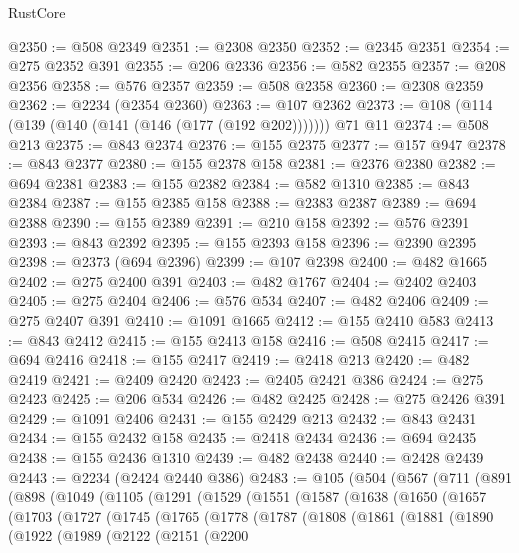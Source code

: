 \begin{lexlean}{RustCore}
\begin{coremodule}
@2350 := @508 @2349
@2351 := @2308 @2350
@2352 := @2345 @2351
@2354 := @275 @2352 @391
@2355 := @206 @2336
@2356 := @582 @2355
@2357 := @208 @2356
@2358 := @576 @2357
@2359 := @508 @2358
@2360 := @2308 @2359
@2362 := @2234 (@2354 @2360)
@2363 := @107 @2362
@2373 := @108 (@114 (@139 (@140 (@141 (@146 (@177 (@192 @202))))))) @71 @11
@2374 := @508 @213
@2375 := @843 @2374
@2376 := @155 @2375
@2377 := @157 @947
@2378 := @843 @2377
@2380 := @155 @2378 @158
@2381 := @2376 @2380
@2382 := @694 @2381
@2383 := @155 @2382
@2384 := @582 @1310
@2385 := @843 @2384
@2387 := @155 @2385 @158
@2388 := @2383 @2387
@2389 := @694 @2388
@2390 := @155 @2389
@2391 := @210 @158
@2392 := @576 @2391
@2393 := @843 @2392
@2395 := @155 @2393 @158
@2396 := @2390 @2395
@2398 := @2373 (@694 @2396)
@2399 := @107 @2398
@2400 := @482 @1665
@2402 := @275 @2400 @391
@2403 := @482 @1767
@2404 := @2402 @2403
@2405 := @275 @2404
@2406 := @576 @534
@2407 := @482 @2406
@2409 := @275 @2407 @391
@2410 := @1091 @1665
@2412 := @155 @2410 @583
@2413 := @843 @2412
@2415 := @155 @2413 @158
@2416 := @508 @2415
@2417 := @694 @2416
@2418 := @155 @2417
@2419 := @2418 @213
@2420 := @482 @2419
@2421 := @2409 @2420
@2423 := @2405 @2421 @386
@2424 := @275 @2423
@2425 := @206 @534
@2426 := @482 @2425
@2428 := @275 @2426 @391
@2429 := @1091 @2406
@2431 := @155 @2429 @213
@2432 := @843 @2431
@2434 := @155 @2432 @158
@2435 := @2418 @2434
@2436 := @694 @2435
@2438 := @155 @2436 @1310
@2439 := @482 @2438
@2440 := @2428 @2439
@2443 := @2234 (@2424 @2440 @386)
@2483 := @105
    (@504
      (@567
        (@711
          (@891
            (@898
              (@1049
                (@1105
                  (@1291
                    (@1529
                      (@1551
                        (@1587
                          (@1638
                            (@1650
                              (@1657
                                (@1703
                                  (@1727
                                    (@1745
                                      (@1765
                                        (@1778
                                          (@1787
                                            (@1808
                                              (@1861
                                                (@1881
                                                  (@1890
                                                    (@1922
                                                      (@1989
                                                        (@2122
                                                          (@2151
                                                            (@2200

\end{coremodule}
\end{lexlean}
